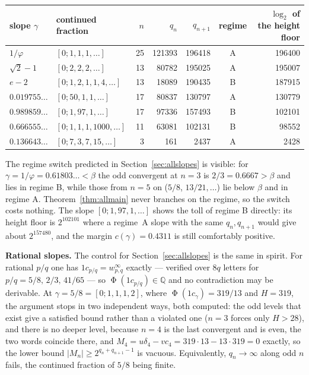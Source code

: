 \documentclass[11pt,reqno]{amsart}
\theoremstyle{plain}
\theoremstyle{definition}
\newcommand{\Q}{\mathbb{Q}}
\DeclareMathOperator{\Ph}{\Phi}
\begin{document}
\begin{center}\small
\begin{tabular}{@{}llrrrcr@{}}
\toprule
slope $\gamma$ & continued fraction & $n$ & $q_n$ & $q_{n+1}$ & regime & $\log_2$ of the height floor\\
\midrule
$1/\varphi$            & $[0;1,1,1,\dots]$          & 25 & 121393 & 196418 & A & 196400\\
$\sqrt2-1$             & $[0;2,2,2,\dots]$          & 13 &  80782 & 195025 & A & 195007\\
$e-2$                  & $[0;1,2,1,1,4,\dots]$      & 13 &  18089 & 190435 & B & 187915\\
$0.019755\ldots$       & $[0;50,1,1,\dots]$         & 17 &  80837 & 130797 & A & 130779\\
$0.989859\ldots$       & $[0;1,97,1,\dots]$         & 17 &  97336 & 157493 & B & 102101\\
$0.666555\ldots$       & $[0;1,1,1,1000,\dots]$     & 11 &  63081 & 102131 & B &  98552\\
$0.136643\ldots$       & $[0;7,3,7,15,\dots]$       &  3 &    161 &   2437 & A &   2428\\
\bottomrule
\end{tabular}
\end{center}

\noindent The regime switch predicted in Section~\ref{sec:allslopes} is visible:
for $\gamma=1/\varphi=0.61803\ldots<\beta$ the odd convergent at $n=3$ is
$2/3=0.6667>\beta$ and lies in regime B, while those from $n=5$ on
($5/8$, $13/21,\dots$) lie below $\beta$ and in regime A. Theorem~\ref{thm:allmain}
never branches on the regime, so the switch costs nothing. The slope
$[0;1,97,1,\dots]$ shows the toll of regime B directly: its height floor is
$2^{102101}$ where a regime~A slope with the same $q_n,q_{n+1}$ would give about
$2^{157480}$, and the margin $c(\gamma)=0.4311$ is still comfortably positive.

\medskip
\noindent\textbf{Rational slopes.} The control for
Section~\ref{sec:allslopes} is the same in spirit. For rational $p/q$ one has
$1c_{p/q}=w_{p,q}^\infty$ exactly --- verified over $8q$ letters for
$p/q=5/8,\,2/3,\,41/65$ --- so $\Ph(1c_{p/q})\in\Q$ and no contradiction may be
derivable. At $\gamma=5/8=[0;1,1,1,2]$, where $\Ph(1c_\gamma)=319/13$ and
$H=319$, the argument stops in two independent ways, both computed: the odd
levels that exist give a satisfied bound rather than a violated one ($n=3$
forces only $H>28$), and there is no deeper level, because $n=4$ is the last
convergent and is even, the two words coincide there, and
$M_4=u\delta_4-vc_4=319\cdot13-13\cdot319=0$ exactly, so the lower bound
$|M_n|\ge2^{q_n+q_{n+1}-1}$ is vacuous. Equivalently, $q_n\to\infty$ along odd
$n$ fails, the continued fraction of $5/8$ being finite.
\end{document}
